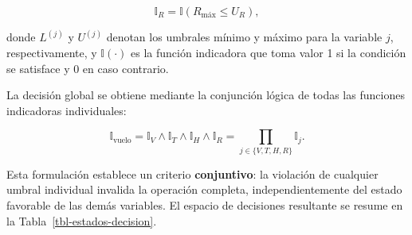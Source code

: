 \documentclass[
  spanish,
  us-letterpaper,
]{scrreprt}
\numberwithin{equation}{section}
\begin{document}
\[
\mathbb{I}_R = \mathbb{I}\left( R_{\text{máx}} \leq U_R \right),
\]

donde \(L^{(j)}\) y \(U^{(j)}\) denotan los umbrales mínimo y máximo
para la variable \(j\), respectivamente, y \(\mathbb{I}(\cdot)\) es la
función indicadora que toma valor 1 si la condición se satisface y 0 en
caso contrario.

La decisión global se obtiene mediante la conjunción lógica de todas las
funciones indicadoras individuales:

\[
\mathbb{I}_{\text{vuelo}} = \mathbb{I}_V \land \mathbb{I}_T \land \mathbb{I}_H \land \mathbb{I}_R = \prod_{j \in \{V,T,H,R\}} \mathbb{I}_j.
\]

Esta formulación establece un criterio \textbf{conjuntivo}: la violación
de cualquier umbral individual invalida la operación completa,
independientemente del estado favorable de las demás variables. El
espacio de decisiones resultante se resume en la
Tabla~\ref{tbl-estados-decision}.
\end{document}
